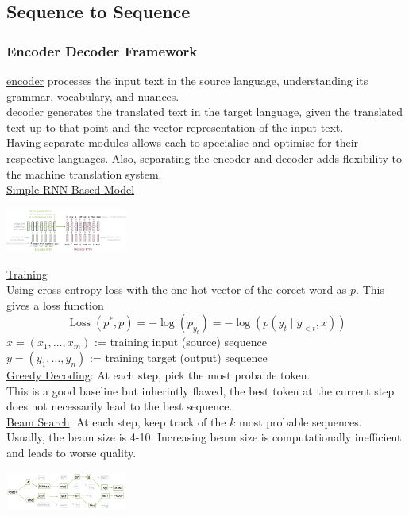 \documentclass[8pt]{extarticle} %
\begin{document}
\begin{multicols*}{3}
\subsection*{Sequence to Sequence}
\subsubsection*{Encoder Decoder Framework}
\underline{encoder} processes the input text in the source language, 
understanding its grammar, vocabulary, and nuances. \\
\underline{decoder} generates the translated text in the target language, given the translated text up 
to that point and the vector representation of the input text. \\

Having separate modules allows each to specialise and optimise for their respective languages. Also, separating the encoder and decoder adds flexibility to the machine translation system. \\

\underline{Simple RNN Based Model}
\begin{center}
    \includegraphics[width=0.3\textwidth]{media/seq2seqrnn.png}
\end{center}

\underline{Training}\\
Using cross entropy loss with the one-hot vector of the corect word as $p$. This gives a loss function
$$\operatorname{Loss}\left(p^*, p\right)=-\log \left(p_{y_t}\right)=-\log \left(p\left(y_t \mid y_{<t}, x\right)\right)$$
$x=\left(x_1, \ldots, x_m\right)$ := training input (source) sequence\\
$y=\left(y_1, \ldots, y_n\right)$ := training target (output) sequence\\

\underline{Greedy Decoding}: At each step, pick the most probable token.\\
This is a good baseline but inherintly flawed, the best token at the current step does not necessarily lead to the best sequence.\\

\underline{Beam Search}: At each step, keep track of the $k$ most probable sequences.\\
Usually, the beam size is 4-10. Increasing beam size is computationally inefficient and leads to worse quality.
\begin{center}
    \includegraphics[width=0.3\textwidth]{media/beam-search.png}
\end{center}    


\end{multicols*}
\end{document}
